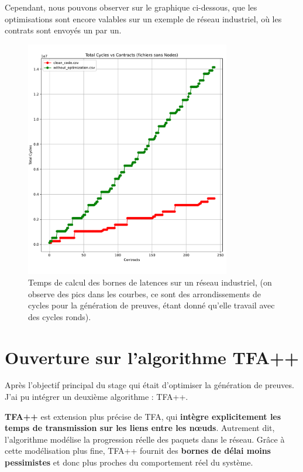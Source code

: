 \documentclass[12pt]{report}
\begin{document}
\bigskip

Cependant, nous pouvons observer sur le graphique ci-dessous, que les optimisations sont 
encore valables sur un exemple de réseau industriel, où les contrats sont envoyés 
un par un.

\begin{figure}[H]
    \centering
    \includegraphics[width=0.8\textwidth]{benchmark_indusnet.pdf}
    \caption{Temps de calcul des bornes de latences sur un réseau industriel, 
    (on observe des pics dans
    les courbes, ce sont des arrondissements de cycles pour la génération de preuves, étant donné qu'elle travail avec des cycles ronds).}
\end{figure}



\chapter{Ouverture sur l'algorithme TFA++}

Après l'objectif principal du stage qui était d'optimiser la génération de preuves.
J'ai pu intégrer un deuxième algorithme : TFA++.

\bigskip

\textbf{TFA++} est extension plus précise de TFA, qui 
\textbf{intègre explicitement les temps de transmission sur les 
liens entre les nœuds}. Autrement dit, l'algorithme modélise la 
progression réelle des paquets dans le réseau. Grâce à cette modélisation plus fine, 
TFA++ fournit des \textbf{bornes de délai moins pessimistes} et 
donc plus proches du comportement réel du système.
\end{document}

